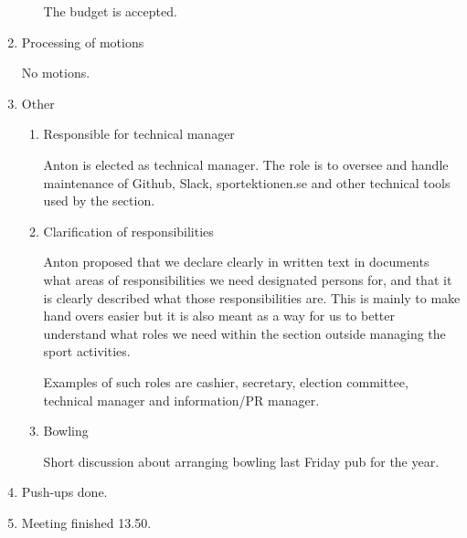 \documentclass[12pt,a4paper]{article}
\begin{document}
\begin{enumerate}
\begin{itemize}
					The budget is accepted.
			\end{itemize}
		\item Processing of motions
		
			No motions.
			
		\item Other
			\begin{enumerate}
				\item Responsible for technical manager
				
					Anton is elected as technical manager. The role is to oversee and handle maintenance of Github, Slack, sportektionen.se and other technical tools used by the section.
					
				\item Clarification of responsibilities
				
					Anton proposed that we declare clearly in written text in documents what areas of responsibilities we need designated persons for, and that it is clearly described what those responsibilities are. This is mainly to make hand overs easier but it is also meant as a way for us to better understand what roles we need within the section outside managing the sport activities.
					
					Examples of such roles are cashier, secretary, election committee, technical manager and information/PR manager.
					
				\item Bowling

					Short discussion about arranging bowling last Friday pub for the year.
					
			\end{enumerate}
		\item Push-ups done.
		\item Meeting finished 13.50.
	\end{enumerate}
\end{document}
